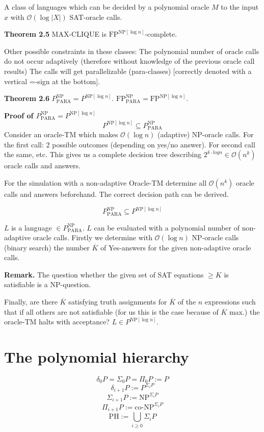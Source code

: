 \documentclass[a4paper]{article}
\newcommand{\cls}[1]{\rm{#1}}
\begin{document}
A class of languages which can be decided by a polynomial oracle $M$
to the input $x$ with $\mathcal{O}(\log{|X|})$ SAT-oracle calls.

\textbf{Theorem 2.5}
MAX-CLIQUE is $\text{FP}^{\text{NP} [\log{n}]}$-complete.

Other possible constraints in these classes:
The polynomial number of oracle calls do not occur adaptively
(therefore without knowledge of the previous oracle call results)
The calls will get parallelizable (para-classes) [correctly denoted
with a vertical =-sign at the bottom].

\textbf{Theorem 2.6}
  $P_{\text{PARA}}^{\text{NP}} = P^{\text{NP} [\log{n}]}$.
  $\text{FP}_{\text{PARA}}^{\text{NP}} = \text{FP}^{\text{NP} [\log{n}]}$.


\textbf{Proof of $P_{\text{PARA}}^{\text{NP}} = P^{\text{NP} [\log{n}]}$}
\[
  P^{\text{NP}[\log{n}]} \subseteq P_{\text{PARA}}^{\text{NP}}
\]
Consider an oracle-TM which makes $\mathcal{O}(\log{n})$ (adaptive)
\cls{NP}-oracle calls. For the first call: 2 possible outcomes
(depending on yes/no answer). For second call the same, etc.
This gives us a complete decision tree describing $2^{k \cdot log{n}}
\in \mathcal{O}(n^k)$ oracle calls and answers.

For the simulation with a non-adaptive Oracle-TM determine all $\mathcal{O}(n^k)$
oracle calls and answers beforehand. The correct decision path can be derived.

\[
  P_{\text{PARA}}^{\text{NP}} \subseteq P^{\text{NP}[\log{n}]}
\]

$L$ is a language $\in P_{\text{PARA}}^{\text{NP}}$.
$L$ can be evaluated with a polynomial number of non-adaptive oracle calls.
Firstly we determine with $\mathcal{O}(\log{n})$ \cls{NP}-oracle calls (binary search)
the number $\overline{K}$ of Yes-answers for the given non-adaptive oracle calls.

\textbf{Remark.}
  The question whether the given set of SAT equations $\geq K$
  is satisfiable is a \cls{NP}-question.

Finally, are there $\overline{K}$ satisfying truth assignments
for $\overline{K}$ of the $n$ expressions such that if all others are not
satisfiable (for us this is the case because of $\overline{K}$ max.)
the oracle-TM halts with acceptance? $L \in P^{\text{NP}[\log{n}]}$.

\section{The polynomial hierarchy}
%
\[
  \delta_0 P = \Sigma_0 P = \Pi_0 P := P
\] \[
  \delta_{i+1} P := P^{\Sigma_i P}
\] \[
  \Sigma_{i+1} P := \text{NP}^{\Sigma_i P}
\] \[
  \Pi_{i+1} P := \text{co-NP}^{\Sigma_i P}
\] \[
  \text{PH} := \bigcup_{i\geq0} \Sigma_i P
\]
\end{document}
